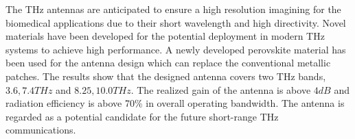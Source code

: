 \documentclass[12pt]{suhbook}
\begin{document}
The THz antennas are anticipated to ensure a high resolution imagining for the biomedical applications due to their short wavelength and high directivity. Novel materials have been developed for the potential deployment in modern THz systems to achieve high performance.  A newly developed perovskite material has been used for the antenna design which can replace the conventional metallic patches. The results show that the designed antenna covers two THz bands, $3.6,7.4 THz$ and $8.25,10.0 THz$. The realized gain of the antenna is above $4 dB$ and radiation efficiency is above 70\% in overall operating bandwidth. The antenna is regarded as a potential candidate for the future short-range THz communications.


\end{document}
